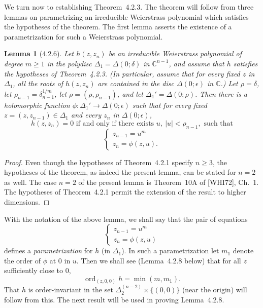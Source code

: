 \documentclass[11pt]{article}
\theoremstyle{plain}
\newtheorem*{lemma*}{Lemma}
\theoremstyle{definition}
\newcommand{\C}{\mathbb{C}}
\DeclareMathOperator{\ord}{ord}
\begin{document}
We turn now to establishing Theorem~4.2.3. The theorem will follow
from three lemmas on parametrizing an irreducible Weierstrass
polynomial which satisfies the hypotheses of the theorem. The first
lemma asserts the existence of a parametrization for such a
Weierstrass polynomial.

\begin{lemma*}[4.2.6]
Let $h(z, z_n)$ be an irreducible Weierstrass polynomial of degree
$m \ge 1$ in the polydisc $\Delta_1 = \Delta(0; \delta)$ in
$\C^{n-1}$, and assume that $h$ satisfies the hypotheses of
Theorem~4.2.3. (In particular, assume that for every fixed $z$ in
$\Delta_1$, all the roots of $h(z, z_n)$ are contained in the disc
$\Delta(0; \epsilon)$ in $\C$.) Let $\rho = \delta$, let
$\rho_{n-1} = \delta_{n-1}^{1/m}$, let $\rho = (\rho, \rho_{n-1})$,
and let $\Delta_1' = \Delta(0; \rho)$. Then there is a holomorphic
function $\phi : \Delta_1' \to \Delta(0; \epsilon)$ such that for
every fixed $z = (z, z_{n-1}) \in \Delta_1$ and every $z_n$ in
$\Delta(0; \epsilon)$,
\[
h(z, z_n) = 0 \text{ if and only if there exists } u,\ |u| < \rho_{n-1},
\text{ such that}
\]
\[
\begin{cases}
z_{n-1} = u^m \\
z_n = \phi(z, u).
\end{cases}
\]
\end{lemma*}

\begin{proof}
Even though the hypotheses of Theorem~4.2.1 specify $n \ge 3$, the
hypotheses of the theorem, as indeed the present lemma, can be stated
for $n = 2$ as well. The case $n = 2$ of the present lemma is
Theorem~10A of [WHI72], Ch.~1. The hypotheses of Theorem~4.2.1
permit the extension of the result to higher dimensions.
\end{proof}

With the notation of the above lemma, we shall say that the pair of
equations
\[
\begin{cases}
z_{n-1} = u^m \\
z_n = \phi(z, u)
\end{cases}
\]
defines a \emph{parametrization} for $h$ (in $\Delta_1$). In such a
parametrization let $m_1$ denote the order of $\phi$ at $0$ in $u$.
Then we shall see (Lemma~4.2.8 below) that for all $z$ sufficiently
close to $0$,
\[
\ord_{(z, 0, 0)} h = \min(m, m_1).
\]
That $h$ is order-invariant in the set
$\Delta_2^{(n-2)} \times \{ (0, 0) \}$ (near the origin) will follow
from this. The next result will be used in proving Lemma~4.2.8.
\end{document}
